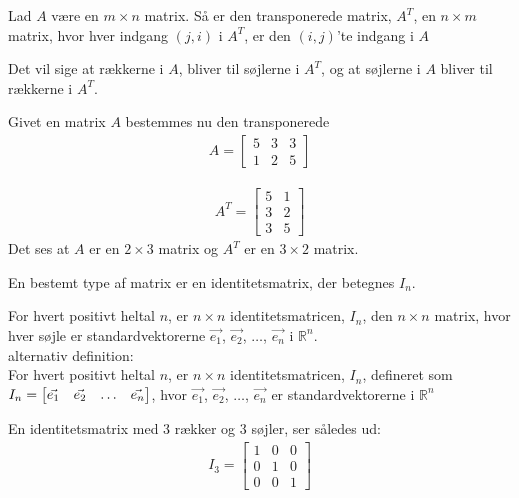 \begin{defn}
Lad $A$ være en $m \times n$ matrix. Så er den transponerede matrix, $A^T$, en $n \times m$ matrix, hvor hver indgang $(j,i)$ i $A^T$, er den $(i,j)$'te indgang i $A$
\label{def:(transmatrix)} 
\end{defn}
Det vil sige at rækkerne i $A$, bliver til søjlerne i $A^T$, og at søjlerne i $A$ bliver til rækkerne i $A^T$.

\begin{eks}
Givet en matrix $A$ 	bestemmes nu den transponerede
\begin{align*}
A = \begin{bmatrix}
	5 & 3 & 3 \\
	1 & 2 & 5
\end{bmatrix}
\end{align*}

\begin{align*}
A^T = \begin{bmatrix}
	5 & 1  \\
	3 & 2  \\
	3 & 5
\end{bmatrix}
\end{align*}
Det ses at $A$ er en $2 \times 3$ matrix og $A^T$ er en $3 \times 2$ matrix. 
\end{eks}


En bestemt type af matrix er en identitetsmatrix, der betegnes $I_n$. 

\begin{defn} [Identitetsmatrix]
For hvert positivt heltal $n$, er $n \times n$ identitetsmatricen, $I_n$, den $n \times n$ matrix, hvor hver søjle er standardvektorerne $\vec{e_1}$, $\vec{e_2}$, $\dots$, $\vec{e_n}$ i $\mathds{R}^n$.\\

alternativ definition:\\
For hvert positivt heltal $n$, er $n \times n$ identitetsmatricen, $I_n$, defineret som\\ $I_n = \begin{bmatrix} \vec{e_1} & \vec{e_2} & \dots &  \vec{e_n} \end{bmatrix}$, hvor $\vec{e_1}$, $\vec{e_2}$, $\dots$, $\vec{e_n}$ er standardvektorerne i $\mathds{R}^n$
\label{def:imatrix}
\end{defn}

En identitetsmatrix med $3$ rækker og $3$ søjler, ser således ud:
\begin{align*}
I_3 = \begin{bmatrix}
	1 & 0 & 0 \\
	0 & 1 & 0 \\
	0 & 0 & 1 
\end{bmatrix}
\end{align*}

